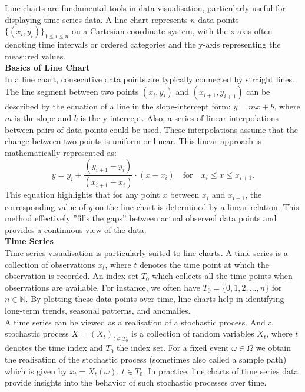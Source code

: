 \documentclass{article}\usepackage[]{graphicx}\usepackage[]{xcolor}
\begin{document}
Line charts are fundamental tools in data visualisation, particularly useful for displaying time series data. A line chart represents $n$ data points 
$\{(x_i,y_i)\}_{1 \leq i \leq n}$ on a Cartesian coordinate system, with the x-axis often denoting time intervals or ordered categories and the y-axis representing the measured values.\\ 

\noindent 
\textbf{Basics of Line Chart}\\
\noindent
In a line chart, consecutive data points are typically connected by straight lines. The line segment between two points \((x_i,y_i)\) and \((x_{i+1},y_{i+1})\) can be described by the equation of a line in the slope-intercept form: \(y=mx+b\), where \(m\) is the slope and \(b\) is the y-intercept. Also, a series of linear interpolations between pairs of data points could be used. These interpolations assume that the change between two points is uniform or linear. This linear approach is mathematically represented as:
\[
y = y_i + \frac{(y_{i+1} - y_i)}{(x_{i+1} - x_i)} \cdot (x - x_i) \quad \text{for} \quad x_i \leq x \leq x_{i+1}.
\]
\noindent
This equation highlights that for any point \(x\) between \(x_i\) and \(x_{i+1}\), the corresponding value of \(y\) on the line chart is determined by a linear relation. This method effectively ''fills the gaps'' between actual observed data points and provides a continuous view of the data.\\

\noindent 
\textbf{Time Series}\\
\noindent
Time series visualisation is particularly suited to line charts. A time series is a collection of observations $x_t$, where $t$ denotes the time point at which the observation is recorded. An index set $T_0$ which collects all the time points when observations are available. For instance, we often have $T_0 = \{0,1,2,...,n\}$ for $n \in \mathbb{N}$. By plotting these data points over time, line charts help in identifying long-term trends, seasonal patterns, and anomalies.\\

\noindent
A time series can be viewed as a realisation of a stochastic process. And a stochastic process \cite{Brockwell2016Introduction} $X = (X_t)_{t \in T_0}$ is a collection of random variables $X_t$, where $t$ denotes the time index and $T_0$ the index set. For a fixed event $\omega \in \Omega$ we obtain the realisation of the stochastic process (sometimes also called a sample path) which is given by $x_t = X_t(\omega)$, $t \in T_0$. In practice, line charts of time series data provide insights into the behavior of such stochastic processes over time.\\
\end{document}
